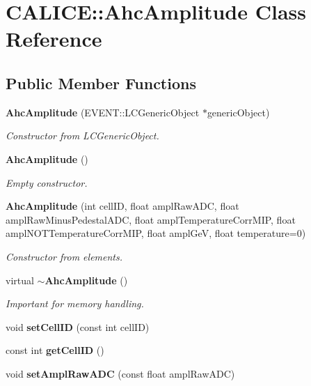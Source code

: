 \section{CALICE::AhcAmplitude Class Reference}
\label{classCALICE_1_1AhcAmplitude}
\subsection*{Public Member Functions}
\begin{DoxyCompactItemize}
\item 
{\bf AhcAmplitude} (EVENT::LCGenericObject $\ast$genericObject)
\begin{DoxyCompactList}\small\item\em Constructor from LCGenericObject. \item\end{DoxyCompactList}\item 
{\bf AhcAmplitude} ()
\begin{DoxyCompactList}\small\item\em Empty constructor. \item\end{DoxyCompactList}\item 
{\bf AhcAmplitude} (int cellID, float amplRawADC, float amplRawMinusPedestalADC, float amplTemperatureCorrMIP, float amplNOTTemperatureCorrMIP, float amplGeV, float temperature=0)
\begin{DoxyCompactList}\small\item\em Constructor from elements. \item\end{DoxyCompactList}\item 
virtual {\bf $\sim$AhcAmplitude} ()\label{classCALICE_1_1AhcAmplitude_a9098e06a99ede647985f9740bea488c9}

\begin{DoxyCompactList}\small\item\em Important for memory handling. \item\end{DoxyCompactList}\item 
void {\bfseries setCellID} (const int cellID)\label{classCALICE_1_1AhcAmplitude_af30305bc770835cef1e85b52861a8d77}

\item 
const int {\bfseries getCellID} ()\label{classCALICE_1_1AhcAmplitude_a8ba74fcf68e917e51fe0815c1ff81583}

\item 
void {\bfseries setAmplRawADC} (const float amplRawADC)\label{classCALICE_1_1AhcAmplitude_a1bf9f7c2837899af1ef2df59ef94866b}


\end{DoxyCompactItemize}
